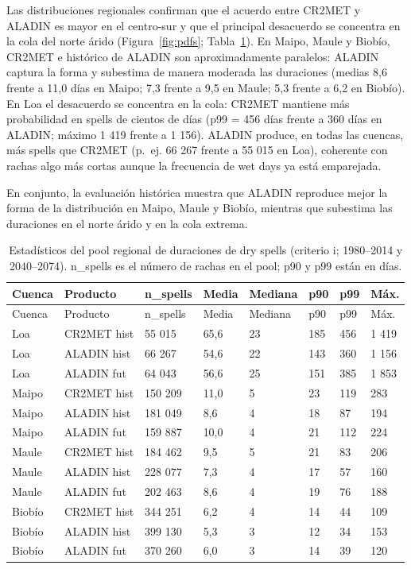 Las distribuciones regionales confirman que el acuerdo entre CR2MET y ALADIN es mayor en el centro-sur y que el principal desacuerdo se concentra en la cola del norte árido (Figura~\ref{fig:pdfs}; Tabla~\ref{tab:estadisticos}). En Maipo, Maule y Biobío, CR2MET e histórico de ALADIN son aproximadamente paralelos: ALADIN captura la forma y subestima de manera moderada las duraciones (medias 8,6 frente a 11,0 días en Maipo; 7,3 frente a 9,5 en Maule; 5,3 frente a 6,2 en Biobío). En Loa el desacuerdo se concentra en la cola: CR2MET mantiene más probabilidad en spells de cientos de días (p99 = 456 días frente a 360 días en ALADIN; máximo 1 419 frente a 1 156). ALADIN produce, en todas las cuencas, más spells que CR2MET (p.~ej. 66 267 frente a 55 015 en Loa), coherente con rachas algo más cortas aunque la frecuencia de wet days ya está emparejada.

En conjunto, la evaluación histórica muestra que ALADIN reproduce mejor la forma de la distribución en Maipo, Maule y Biobío, mientras que subestima las duraciones en el norte árido y en la cola extrema.

\begin{longtable}[]{@{}llllllll@{}}
\caption[Estadísticos del pool regional de duraciones de dry spells (criterio i; 1980--2014 y 2040--2074)]{Estadísticos del pool regional de duraciones de dry spells (criterio i; 1980--2014 y 2040--2074). n\_spells es el número de rachas en el pool; p90 y p99 están en días.}\label{tab:estadisticos}\tabularnewline
\toprule\noalign{}
Cuenca & Producto & n\_spells & Media & Mediana & p90 & p99 & Máx. \\
\midrule\noalign{}
\endfirsthead
\toprule\noalign{}
Cuenca & Producto & n\_spells & Media & Mediana & p90 & p99 & Máx. \\
\midrule\noalign{}
\endhead
\bottomrule\noalign{}
\endlastfoot
Loa & CR2MET hist & 55 015 & 65,6 & 23 & 185 & 456 & 1 419 \\
Loa & ALADIN hist & 66 267 & 54,6 & 22 & 143 & 360 & 1 156 \\
Loa & ALADIN fut & 64 043 & 56,6 & 25 & 151 & 385 & 1 853 \\
Maipo & CR2MET hist & 150 209 & 11,0 & 5 & 23 & 119 & 283 \\
Maipo & ALADIN hist & 181 049 & 8,6 & 4 & 18 & 87 & 194 \\
Maipo & ALADIN fut & 159 887 & 10,0 & 4 & 21 & 112 & 224 \\
Maule & CR2MET hist & 184 462 & 9,5 & 5 & 21 & 83 & 206 \\
Maule & ALADIN hist & 228 077 & 7,3 & 4 & 17 & 57 & 160 \\
Maule & ALADIN fut & 202 463 & 8,6 & 4 & 19 & 76 & 188 \\
Biobío & CR2MET hist & 344 251 & 6,2 & 4 & 14 & 44 & 109 \\
Biobío & ALADIN hist & 399 130 & 5,3 & 3 & 12 & 34 & 153 \\
Biobío & ALADIN fut & 370 260 & 6,0 & 3 & 14 & 39 & 120 \\
\end{longtable}


